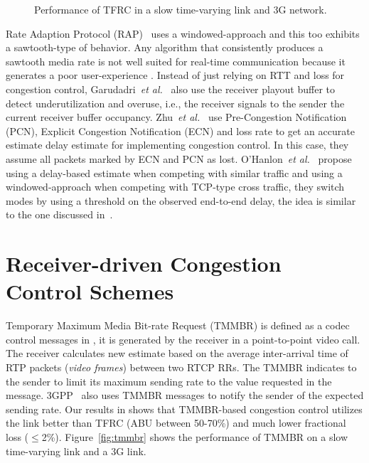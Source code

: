 \begin{figure}
  \centerline{
  }
  \caption{Performance of TFRC in a slow time-varying link and 3G network.}
  \label{fig:tfrc}
\end{figure}

Rate Adaption Protocol (RAP)~\cite{rap:752152} uses a windowed-approach and
this too exhibits a sawtooth-type of behavior. Any algorithm that consistently
produces a sawtooth media rate is not well suited for real-time communication
because it generates a poor user-experience
\cite{Gharai:2002wt,VladBalan:2007dq, Zink03subjectiveimpression}. Instead of
just relying on RTT and loss for congestion control, Garudadri~\textit{et
al.}~\cite{4397059} also use the receiver playout buffer to detect
underutilization and overuse, i.e., the receiver signals to the sender the
current receiver buffer occupancy. Zhu~\textit{et al.}~\cite{rmcat-nada} use
Pre-Congestion Notification (PCN), Explicit Congestion Notification (ECN) and
loss rate to get an accurate estimate delay estimate for implementing
congestion control. In this case, they assume all packets marked by ECN and
PCN as lost. O'Hanlon~\textit{et al.}~\cite{rmcat-dflow} propose using a
delay-based estimate when competing with similar traffic and using a
windowed-approach when competing with TCP-type cross traffic, they switch
modes by using a threshold on the observed end-to-end delay, the idea is
similar to the one discussed in~\cite{budzisz2011fair}.


\section{Receiver-driven Congestion Control Schemes}

Temporary Maximum Media Bit-rate Request (TMMBR) is defined as a codec control
messages in \cite{rfc5104}, it is generated by the receiver in a
point-to-point video call. The receiver calculates new estimate based on the
average inter-arrival time of RTP packets (\emph{video frames}) between two
RTCP RRs. The TMMBR indicates to the sender to limit its maximum sending rate
to the value requested in the message. 3GPP~\cite{3gpp.26.114} also uses TMMBR
messages to notify the sender of the expected sending rate. Our results in
 shows that TMMBR-based congestion control utilizes the link
better than TFRC (ABU between 50-70\%) and much lower fractional loss
($\le$2\%). Figure~\ref{fig:tmmbr} shows the performance of TMMBR on a slow
time-varying link and a 3G link.

